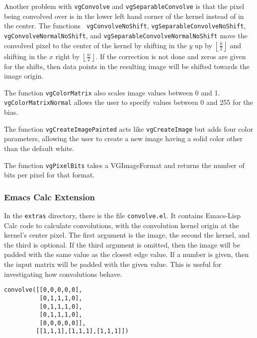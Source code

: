\documentclass[12pt]{report}
\begin{document}
Another problem with {\tt vgConvolve} and {\tt vgSeparableConvolve} is
that the pixel being convolved over is in the lower left hand corner
of the kernel instead of in the center. The functions {\tt
  vgConvolveNoShift}, {\tt vgSeparableConvolveNoShift}, {\tt
  vgConvolveNormalNoShift}, and {\tt vgSeparableConvolveNormalNoShift}
move the convolved pixel to the center of the kernel by shifting in
the $y$ up by $\left\lfloor\frac{h}{2}\right\rfloor$ and shifting in the
$x$ right by $\left\lfloor\frac{w}{2}\right\rfloor$. If the correction is not
done and zeros are given for the shifts, then data points in the
resulting image will be shifted towards the image origin.

The function {\tt vgColorMatrix} also scales image values between 0
and 1.\\ {\tt vgColorMatrixNormal} allows the user to specify values
between 0 and 255 for the bias.

The function {\tt vgCreateImagePainted} acts like {\tt vgCreateImage} but
adds four color parameters, allowing the user to create a new
image having a solid color other than the default white.

The function {\tt vgPixelBits} takes a VGImageFormat and returns the
number of bits per pixel for that format.

\subsubsection{Emacs Calc Extension}
\label{sec-3-1-4-1}
In the {\tt extras} directory, there is the file {\tt convolve.el}. It
contains Emacs-Lisp Calc code to calculate convolutions, with the
convolution kernel origin at the kernel's center pixel. The first
argument is the image, the second the kernel, and the third is
optional. If the third argument is omitted, then the image will be
padded with the same value as the closest edge value. If a number is
given, then the input matrix will be padded with the given value. This
is useful for investigating how convolutions behave.

\begin{lstlisting}
convolve([[0,0,0,0,0],
          [0,1,1,1,0],
          [0,1,1,1,0],
          [0,1,1,1,0],
          [0,0,0,0,0]],
         [[1,1,1],[1,1,1],[1,1,1]])
\end{lstlisting}
\end{document}

